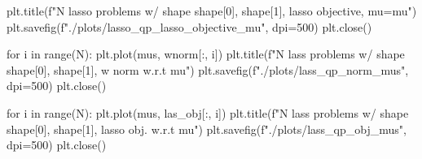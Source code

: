 \documentclass{article}
\begin{document}
\begin{python}
    plt.title(f"{N} lasso problems w/ shape {shape[0], shape[1]}, lasso objective, mu={mu}")
    plt.savefig(f"./plots/lasso_qp_lasso_objective_{mu}", dpi=500)
    plt.close()

for i in range(N):
    plt.plot(mus, wnorm[:, i])
plt.title(f"{N} lass problems w/ shape {shape[0], shape[1]}, w norm w.r.t mu")
plt.savefig(f"./plots/lass_qp_norm_mus", dpi=500)
plt.close()

for i in range(N):
    plt.plot(mus, las_obj[:, i])
plt.title(f"{N} lass problems w/ shape {shape[0], shape[1]}, lasso obj. w.r.t mu")
plt.savefig(f"./plots/lass_qp_obj_mus", dpi=500)
plt.close()

\end{python}
\end{document}
